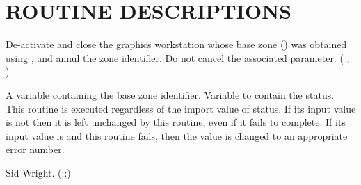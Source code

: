 \section{ROUTINE DESCRIPTIONS}
\begin{manroutinedescription}
     De-activate and close the graphics workstation whose base zone 
     ({}) was obtained using {}, and annul 
     the zone identifier.
     Do not cancel the associated parameter.
     {} {} ( {}, {} )
\begin{manparametertable}
           A variable containing the base zone identifier.
           Variable to contain the status. This routine is executed
           regardless of the import value of status.
           If its input value is not {} then it is left %
unchanged
           by this routine, even if it fails to complete.   If its
           input value is {} and this routine fails, then the
           value is changed to an appropriate error number.
\end{manparametertable}
     Sid Wright. ({}::{})
\end{manroutinedescription}
